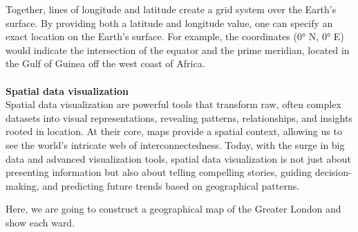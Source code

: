 \documentclass{article}\usepackage[]{graphicx}\usepackage[]{xcolor}
\begin{document}
Together, lines of longitude and latitude create a grid system over the Earth's surface. By providing both a latitude and longitude value, one can specify an exact location on the Earth's surface. For example, the coordinates (0° N, 0° E) would indicate the intersection of the equator and the prime meridian, located in the Gulf of Guinea off the west coast of Africa.
\\\\
\noindent
\textbf{Spatial data visualization}\\
Spatial data visualization are powerful tools that transform raw, often complex datasets into visual representations, revealing patterns, relationships, and insights rooted in location. At their core, maps provide a spatial context, allowing us to see the world's intricate web of interconnectedness. Today, with the surge in big data and advanced visualization tools, spatial data visualization is not just about presenting information but also about telling compelling stories, guiding decision-making, and predicting future trends based on geographical patterns.



\noindent
Here, we are going to construct a geographical map of the Greater London and show each ward. 



\begingroup
\setlength{\intextsep}{5pt plus 2pt minus 2pt}
\setlength{\textfloatsep}{5pt plus 2pt minus 2pt}
\setlength{\abovecaptionskip}{2pt plus 1pt minus 1pt}
\setlength{\belowcaptionskip}{2pt plus 1pt minus 1pt}
\end{document}
